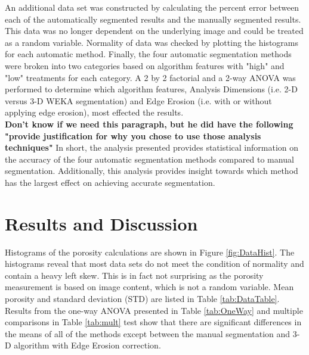 \documentclass[11pt, twocolumn]{article}
\begin{document}
An additional data set was constructed by calculating the percent error between each of the automatically segmented results and the manually segmented results. This data was no longer dependent on the underlying image and could be treated as a random variable. Normality of data was checked by plotting the histograms for each automatic method. Finally, the four automatic segmentation methods  were broken into two categories based on algorithm features with "high" and "low" treatments for each category. A 2 by 2 factorial and a 2-way ANOVA was performed to determine which algorithm features, Analysis Dimensions (i.e. 2-D versus 3-D WEKA segmentation) and Edge Erosion (i.e. with or without applying edge erosion), most effected the results.\\
\textbf{Don't know if we need this paragraph, but he did have the following "provide justification for why you chose to use those analysis techniques"} In short, the analysis presented provides statistical information on the accuracy of the four automatic segmentation methods compared to manual segmentation. Additionally, this analysis provides insight towards which method has the largest effect on achieving accurate segmentation.

\section{Results and Discussion} \label{RandD}
Histograms of the porosity calculations are shown in Figure \ref{fig:DataHist}. The histograms reveal that most data sets do not meet the condition of normality and contain a heavy left skew. This is in fact not surprising as the porosity measurement is based on image content, which is not a random variable. Mean porosity and standard deviation (STD) are listed in Table \ref{tab:DataTable}. Results from the one-way ANOVA presented in Table \ref{tab:OneWay} and multiple comparisons in Table \ref{tab:mult} test show that there are significant differences in the means of all of the methods except between the manual segmentation and 3-D algorithm with Edge Erosion correction. 
\end{document}
